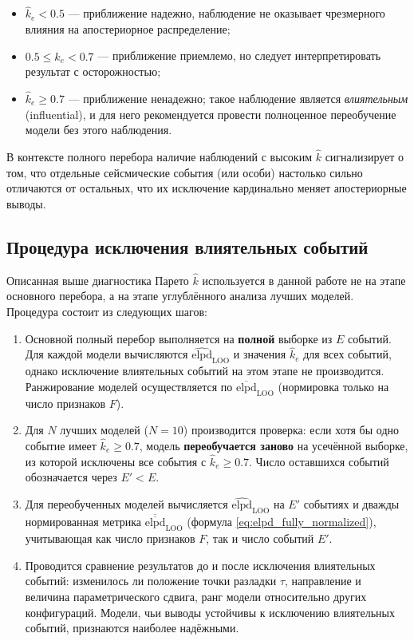 \documentclass[14pt]{mmcs_article}
\begin{document}
\begin{itemize}
	\item $\hat{k}_e < 0.5$ — приближение надежно, наблюдение
	не оказывает чрезмерного влияния на апостериорное
	распределение;
	\item $0.5 \leq \hat{k}_e < 0.7$ — приближение приемлемо,
	но следует интерпретировать результат с
	осторожностью;
	\item $\hat{k}_e \geq 0.7$ — приближение ненадежно; такое
	наблюдение является \textit{влиятельным}
	(influential), и для него рекомендуется провести
	полноценное переобучение модели без этого
	наблюдения.
\end{itemize}

В контексте полного перебора наличие наблюдений с высоким
$\hat{k}$ сигнализирует о том, что отдельные сейсмические
события (или особи) настолько сильно отличаются от остальных,
что их исключение кардинально меняет апостериорные выводы.

\subsection*{Процедура исключения влиятельных событий}

Описанная выше диагностика Парето $\hat{k}$ используется в
данной работе не на этапе основного перебора, а на этапе
углублённого анализа лучших моделей. Процедура состоит из
следующих шагов:

\begin{enumerate}
	\item Основной полный перебор выполняется на \textbf{полной}
	выборке из $E$ событий. Для каждой модели вычисляются
	$\widehat{\mathrm{elpd}}_{\mathrm{LOO}}$ и значения
	$\hat{k}_e$ для всех событий, однако исключение
	влиятельных событий на этом этапе не производится.
	Ранжирование моделей осуществляется по
	$\overline{\mathrm{elpd}}_{\mathrm{LOO}}$ (нормировка
	только на число признаков $F$).
	
	\item Для $N$ лучших моделей ($N = 10$) производится
	проверка: если хотя бы одно событие имеет
	$\hat{k}_e \geq 0.7$, модель \textbf{переобучается
		заново} на усечённой выборке, из которой исключены
	все события с $\hat{k}_e \geq 0.7$. Число оставшихся
	событий обозначается через $E' < E$.
	
	\item Для переобученных моделей вычисляется
	$\widehat{\mathrm{elpd}}_{\mathrm{LOO}}$ на $E'$
	событиях и дважды нормированная метрика
	$\overline{\overline{\mathrm{elpd}}}_{\mathrm{LOO}}$
	(формула \eqref{eq:elpd_fully_normalized}),
	учитывающая как число признаков $F$, так и число
	событий $E'$.
	
	\item Проводится сравнение результатов до и после
	исключения влиятельных событий: изменилось ли
	положение точки разладки $\tau$, направление и
	величина параметрического сдвига, ранг модели
	относительно других конфигураций. Модели, чьи
	выводы устойчивы к исключению влиятельных событий,
	признаются наиболее надёжными.
\end{enumerate}
\end{document}

